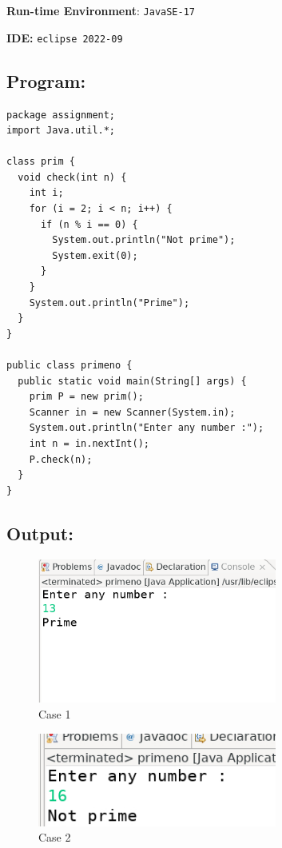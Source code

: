 \documentclass[12pt, a4paper]{article}
\begin{document}
\textbf{Run-time Environment}: \verb+JavaSE-17+

\textbf{IDE:} \verb+eclipse 2022-09+

\subsection*{Program:}
\begin{lstlisting}
package assignment;
import Java.util.*;

class prim {
  void check(int n) {
    int i;
    for (i = 2; i < n; i++) {
      if (n % i == 0) {
        System.out.println("Not prime");
        System.exit(0);
      }
    }
    System.out.println("Prime");
  }
}

public class primeno {
  public static void main(String[] args) {
    prim P = new prim();
    Scanner in = new Scanner(System.in);
    System.out.println("Enter any number :");
    int n = in.nextInt();
    P.check(n);
  }
}
\end{lstlisting}

\subsection*{Output:}
\setcounter{figure}{0}
\begin{figure}[h]
  \centering
  \includegraphics[width=0.7\textwidth]{prime}
  \caption{Case 1}
\end{figure}
\begin{figure}[h]
  \centering
  \includegraphics[width=0.7\textwidth]{notprime}
  \caption{Case 2}
\end{figure}
\newpage
\end{document}
